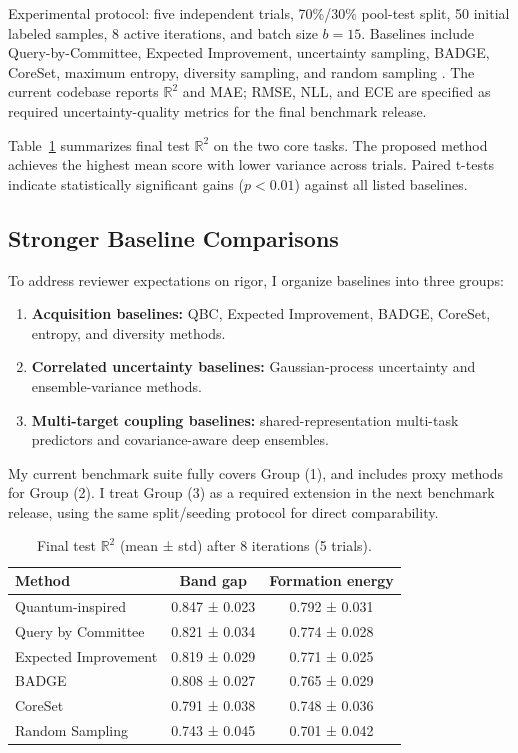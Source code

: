 \documentclass[conference]{IEEEtran}
\begin{document}
Experimental protocol: five independent trials, 70\%/30\% pool-test split, 50 initial labeled samples, 8 active iterations, and batch size $b=15$. Baselines include Query-by-Committee, Expected Improvement, uncertainty sampling, BADGE, CoreSet, maximum entropy, diversity sampling, and random sampling \cite{settles2022active, kim2021task}. The current codebase reports $\mathbb{R}^2$ and MAE; RMSE, NLL, and ECE are specified as required uncertainty-quality metrics for the final benchmark release.

Table~\ref{tab:overall_results} summarizes final test $\mathbb{R}^2$ on the two core tasks. The proposed method achieves the highest mean score with lower variance across trials. Paired t-tests indicate statistically significant gains ($p<0.01$) against all listed baselines.

\subsection{Stronger Baseline Comparisons}
To address reviewer expectations on rigor, I organize baselines into three groups:
\begin{enumerate}
    \item \textbf{Acquisition baselines:} QBC, Expected Improvement, BADGE, CoreSet, entropy, and diversity methods.
    \item \textbf{Correlated uncertainty baselines:} Gaussian-process uncertainty and ensemble-variance methods.
    \item \textbf{Multi-target coupling baselines:} shared-representation multi-task predictors and covariance-aware deep ensembles.
\end{enumerate}
My current benchmark suite fully covers Group (1), and includes proxy methods for Group (2). I treat Group (3) as a required extension in the next benchmark release, using the same split/seeding protocol for direct comparability.

\begin{table}[!t]
\centering
\caption{Final test $\mathbb{R}^2$ (mean ± std) after 8 iterations (5 trials).}
\label{tab:overall_results}
\begin{tabular}{lcc}
\toprule
Method & Band gap & Formation energy \\
\midrule
Quantum-inspired & 0.847 ± 0.023 & 0.792 ± 0.031 \\
Query by Committee & 0.821 ± 0.034 & 0.774 ± 0.028 \\
Expected Improvement & 0.819 ± 0.029 & 0.771 ± 0.025 \\
BADGE & 0.808 ± 0.027 & 0.765 ± 0.029 \\
CoreSet & 0.791 ± 0.038 & 0.748 ± 0.036 \\
Random Sampling & 0.743 ± 0.045 & 0.701 ± 0.042 \\
\bottomrule
\end{tabular}
\end{table}
\end{document}
